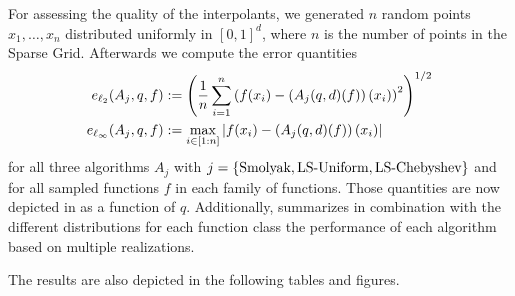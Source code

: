 \documentclass[12pt, oneside]{amsart}
\theoremstyle{definition}
\theoremstyle{remark}
\numberwithin{equation}{section}
\begin{document}
For assessing the quality of the interpolants, we generated $n$ random points 
$x_1, \ldots, x_n$ distributed uniformly in $[0,1]^d$, where $n$ is the number 
of points in the Sparse Grid. Afterwards we compute the error quantities
\begin{align*} 
	e_{\ell_2}(A_j,q,f) &:= \left(\frac{1}{n}\sum_{i=1}^{n}
	\left(f(x_i)-\left(A_j(q,d)(f)\right)(x_i)\right)^2\right)^{1/2}\\
	e_{\ell_\infty}(A_j,q,f) &:= \max_{i\in[1:n]} 
	\left \vert f(x_i)-\left(A_j(q,d)(f)\right)(x_i) \right \vert
\end{align*}
for all three algorithms $A_j$ with $j=\left\{\text{Smolyak}, \text{LS-Uniform}, 
\text{LS-Chebyshev}\right\}$ and for all sampled functions $f$ in each family of 
functions. Those quantities are now depicted in 
 as a function of $q$. 
Additionally,  summarizes in combination with 
the different distributions for each function class 
 the performance of each algorithm based on multiple realizations. 

The results are also depicted in the following tables and figures.




\newpage


\end{document}
